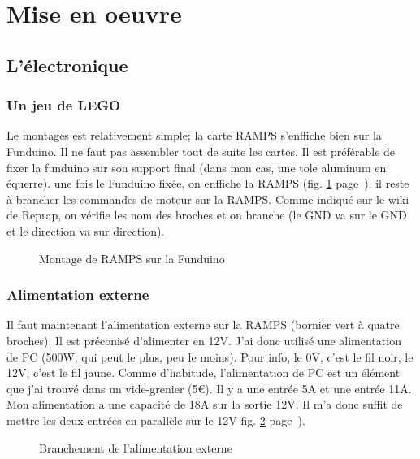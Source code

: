 \section{Mise en oeuvre}%
\subsection{L'électronique}%
\subsubsection{Un jeu de LEGO}
Le montages est relativement simple; la carte RAMPS s'enffiche bien sur la Funduino. %
Il ne faut pas  assembler tout de suite les cartes. Il est préférable de fixer la %
funduino sur son support final (dans mon cas, une tole aluminum en équerre). une fois %
le Funduino fixée, on enffiche  la RAMPS (fig. \ref{montage_carte} %
page~\pageref{montage_carte}). il reste à brancher les commandes de moteur %
sur la RAMPS. Comme indiqué sur le wiki de Reprap, on vérifie les nom des broches et %
on branche (le GND va sur le GND et le direction va sur direction).%
\begin{figure}%
   \caption{\label{montage_carte} Montage de RAMPS sur la Funduino}%
\end{figure}%
\subsubsection{Alimentation externe} %
Il faut maintenant l'alimentation externe sur la RAMPS (bornier vert à quatre broches). %
Il est préconisé d'alimenter en 12V. J'ai donc utilisé une alimentation de PC (500W, %
qui peut le plus, peu le moins). Pour info, le 0V, c'est le fil noir, le 12V, c'est le %
fil jaune. Comme d'habitude, l'alimentation de PC est un élément que j'ai trouvé %
dans un vide-grenier (5\euro{}). Il y a une entrée 5A et une entrée 11A. Mon %
alimentation a une capacité de 18A sur la sortie 12V. Il m'a donc suffit de mettre %
les deux entrées en parallèle sur le 12V fig. \ref{alimentation} %
page~\pageref{alimentation}).%
\begin{figure}%
   \caption{\label{alimentation} Branchement de l'alimentation externe}%
\end{figure}%
